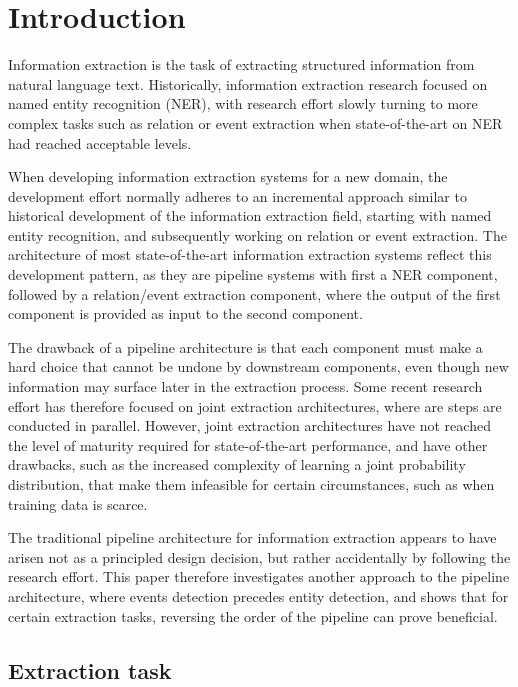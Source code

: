 \section{Introduction}

Information extraction is the task of extracting structured information from natural language text. Historically, information extraction research focused on named entity recognition (NER), with research effort slowly turning to more complex tasks such as relation or event extraction when state-of-the-art on NER had reached acceptable levels. 

When developing information extraction systems for a new domain, the development effort normally adheres to an incremental approach similar to historical development of the information extraction field, starting with named entity recognition, and subsequently working on relation or event extraction. The architecture of most state-of-the-art information extraction systems reflect this development pattern, as they are pipeline systems with first a NER component, followed by a relation/event extraction component, where the output of the first component is provided as input to the second component.

The drawback of a pipeline architecture is that each component must make a hard choice that cannot be undone by downstream components, even though new information may surface later in the extraction process. Some recent research effort has therefore focused on joint extraction architectures, where are steps are conducted in parallel. However, joint extraction architectures have not reached the level of maturity required for state-of-the-art performance, and have other drawbacks, such as the increased complexity of learning a joint probability distribution, that make them infeasible for certain circumstances, such as when training data is scarce.

The traditional pipeline architecture for information extraction appears to have arisen not as a principled design decision, but rather accidentally by following the research effort. This paper therefore investigates another approach to the pipeline architecture, where events detection precedes entity detection, and shows that for certain extraction tasks, reversing the order of the pipeline can prove beneficial.  

\subsection{Extraction task}

